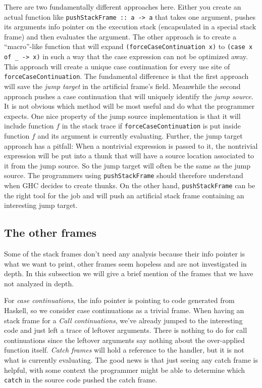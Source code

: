 There are two fundamentally different approaches here. Either you create
an actual function like \texttt{pushStackFrame :: a -> a} that takes
one argument, pushes its arguments info pointer on the execution stack
(encapsulated in a special stack frame) and then evaluates the argument.
The other approach is to create a ``macro''-like function that will
expand \texttt{(forceCaseContinuation x)} to \texttt{(case x of \_ ->
x)} in such a way that the case expression can not be optimized away.
This approach will create a unique case continuation for every use site
of \texttt{forceCaseContinuation}. The fundamental difference is that
the first approach will save the \emph{jump target} in the artificial
frame's field. Meanwhile the second approach pushes a case continuation
that will uniquely identify the \emph{jump source}. It is not obvious
which method will be most useful and do what the programmer expects. One
nice property of the jump source implementation is that it will include
function $f$ in the stack trace if \texttt{forceCaseContinuation} is
put inside function $f$ and its argument is currently evaluating.
Further, the jump target approach has a pitfall: When a nontrivial
expression is passed to it, the nontrivial expression will be put into
a thunk that will have a source location associated to it from the jump
source. So the jump target will often be the same as
the jump source. The programmers using \texttt{pushStackFrame} should
therefore understand when GHC decides to create thunks. On the other
hand, \texttt{pushStackFrame} can be the right tool for the job and will
push an artificial stack frame containing an interesting jump target.

\subsection{The other frames}

Some of the stack frames don't need any analysis because their info
pointer is what we want to print, other frames seem hopeless and are not
investigated in depth. In this subsection we will give a brief mention
of the frames that we have not analyzed in depth.

For \emph{case continuations}, the info pointer is pointing to code
generated from Haskell, so we consider case continuations as a
trivial frame. When having an stack frame for a \emph{Call continuations}, we've already
jumped to the interesting code and just left a trace of leftover arguments.
There is nothing to do for call continuations since the leftover arguments
say nothing about the over-applied function itself.
\emph{Catch frames} will hold a reference to the handler, but it is
not what is currently evaluating. The good news is that just seeing
any catch frame is helpful, with some context the programmer might be
able to determine which \texttt{catch} in the source code pushed the
catch frame.

